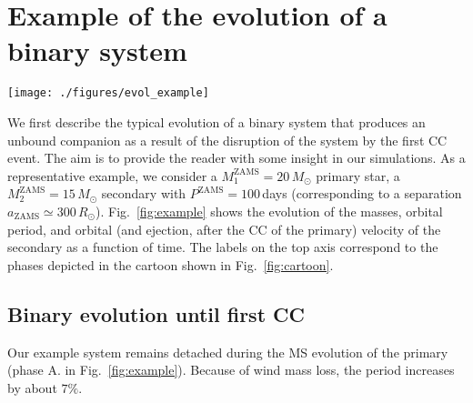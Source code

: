 \documentclass{aa}
\DeclareRobustCommand{\Figref}[1]{Fig.~\ref{#1}}
\DeclareRobustCommand{\Secref}[1]{Sec.~\ref{#1}}
\begin{document}
\section{Example of the evolution of a binary system}
\label{sec:example}

\begin{figure*}[!htbp]
  \centering  
\texttt{[image: ./figures/evol\_example]}  
  \caption{Evolution of an example binary system with 
    $M_1^\mathrm{ZAMS}=20\,M_\odot$, $M_2^\mathrm{ZAMS}=15\,M_\odot$
    binary with $P^\mathrm{ZAMS}=100\,\mathrm{days}$, described in
    \Secref{sec:example} (see also the cartoon in \Figref{fig:cartoon}). The top panel shows the
    primary, secondary, and total mass. The bottom panel shows the
    orbital velocity of the secondary (left
    y-axis) and period of the binary (right y-axis). The labels
    indicate the following phases: A. the MS of the primary, B. case B
    RLOF, emphasized by the vertical dashed line, C. the binary is
    made of a He star (possibly looking like a WR) and a
    rejuvenated MS secondary; D. (and the vertical dot-dashed line)
    marks the explosion of the primary in a SNIb/Ic which unbinds the
    NS and its companion. During the phase E1. the secondary is a slow
    moving walkaway star, traveling for a duration of about half the
    main sequence lifetime of the primary.}
  \label{fig:example}
\end{figure*}

We first describe the typical evolution of a binary system that
produces an unbound companion as a result of the disruption of the
system by the first CC event. The aim is to provide the reader with
some insight in our simulations. As a representative example, we consider
a  $M_1^\mathrm{ZAMS}=20\,M_\odot$ primary star,
a $M_2^\mathrm{ZAMS}=15\,M_\odot$ secondary with
$P^\mathrm{ZAMS}=100$\,days (corresponding to a separation
$a_\mathrm{ZAMS}\simeq300\,R_\odot$). \Figref{fig:example} shows the
evolution of the masses, orbital period, and orbital (and ejection,
after the CC of the primary) velocity of the secondary
as a function of time. The labels on the top axis correspond to the phases depicted in the cartoon shown in \Figref{fig:cartoon}.  

\subsection{Binary evolution until first CC}
\label{sec:example_evol}

Our example system remains detached during the MS evolution
of the primary (phase A. in \Figref{fig:example}). Because of wind mass loss, the period increases by
about $7\%$.
\end{document}
